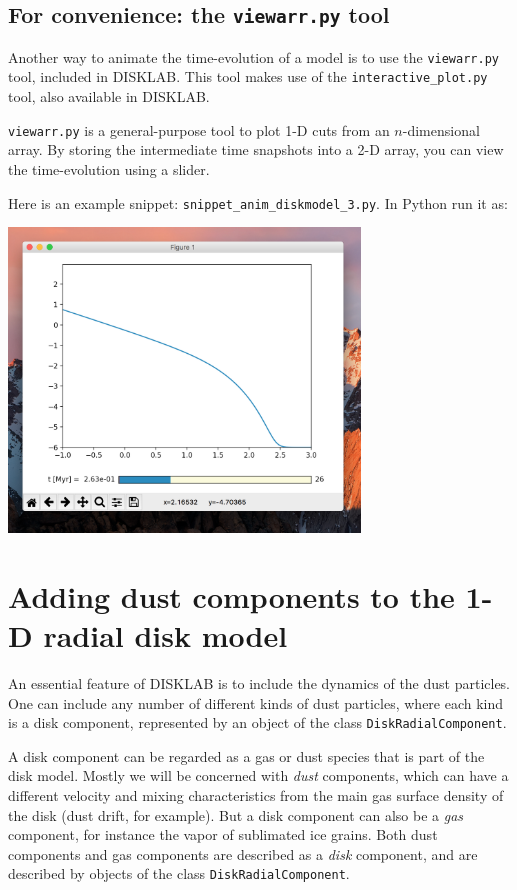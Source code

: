 \documentclass{book}
\newcommand{\code}[1]{{\small\tt #1}}
\begin{document}
\section{For convenience: the {\tt viewarr.py} tool}\label{sec-viewarr}
Another way to animate the time-evolution of a model is to use the
\code{viewarr.py} tool, included in {\sf DISKLAB}. This tool makes use of the
\code{interactive\_plot.py} tool, also available in {\sf DISKLAB}.

\code{viewarr.py} is a general-purpose tool to plot 1-D cuts from an
$n$-dimensional array. By storing the intermediate time snapshots into
a 2-D array, you can view the time-evolution using a slider. 

Here is an example snippet: \code{snippet\_anim\_diskmodel\_3.py}. In Python run
it as:
\begin{codebox}
\end{codebox}

\centerline{\includegraphics[width=0.7\textwidth]{viewarr_example_1.png}}

\chapter{Adding dust components to the 1-D radial disk model}
\label{chap-adding-dust-component}
\label{chap-dust-drift-mixing}
An essential feature of {\sf DISKLAB} is to include the dynamics of the dust
particles. One can include any number of different kinds of dust particles,
where each kind is a disk component, represented by an object of the class
\code{DiskRadialComponent}.

A disk component can be regarded as a gas or dust species that is part of the
disk model. Mostly we will be concerned with {\em dust} components, which can
have a different velocity and mixing characteristics from the main gas surface
density of the disk (dust drift, for example). But a disk component can also be
a {\em gas} component, for instance the vapor of sublimated ice grains. Both
dust components and gas components are described as a {\em disk} component,
and are described by objects of the class \code{DiskRadialComponent}.
\end{document}

